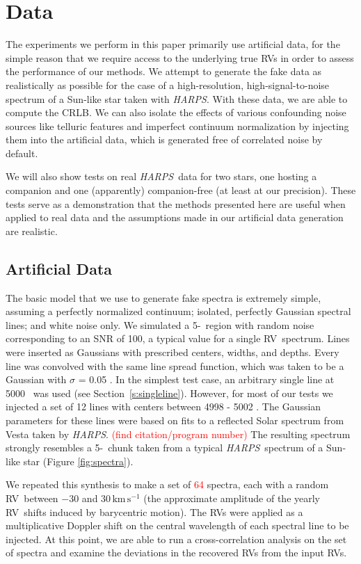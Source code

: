 \documentclass[modern]{aastex62}
\newcommand{\unit}[1]{\mathrm{#1}}
\newcommand{\km}{\unit{km}}
\newcommand{\s}{\unit{s}}
\newcommand{\kms}{\km\,\s^{-1}}
\newcommand{\ang}{\text{\normalfont\AA}}
\newcommand{\sectionname}{Section}
\newcommand{\todo}[1]{\textcolor{red}{#1}}  %
\newcommand{\acronym}[1]{{\small{#1}}}
\newcommand{\project}[1]{\textsl{#1}}
\newcommand{\HARPS}{\project{\acronym{HARPS}}}
\newcommand{\RV}{\acronym{RV}}
\newcommand{\CRLB}{\acronym{CRLB}}
\begin{document}
\section{Data}
\label{s:data}

The experiments we perform in this paper primarily use artificial data, for the simple reason that we require access to the underlying true RVs in order to assess the performance of our methods. 
We attempt to generate the fake data as realistically as possible for the case of a high-resolution, high-signal-to-noise spectrum of a Sun-like star taken with \HARPS. 
With these data, we are able to compute the \CRLB.  
We can also isolate the effects of various confounding noise sources like telluric features and imperfect continuum normalization by injecting them into the artificial data, which is generated free of correlated noise by default.

We will also show tests on real \HARPS\ data for two stars, one hosting a companion and
one (apparently) companion-free (at least at our precision). 
These tests serve as a demonstration that the methods presented here are useful when applied to real data and the assumptions made in our artificial data generation are realistic.

\subsection{Artificial Data}

The basic model that we use to generate fake spectra is extremely simple, assuming a perfectly normalized continuum; isolated, perfectly Gaussian spectral lines; and white noise only. 
We simulated a 5-\ang\ region with random noise corresponding to an SNR of 100, a typical value for a single \RV\ spectrum. 
Lines were inserted as Gaussians with prescribed centers, widths, and depths. 
Every line was convolved with the same line spread function, which was taken to be a Gaussian with $\sigma$ = 0.05 \ang. 
In the simplest test case, an arbitrary single line at 5000 \ang\ was used (see \sectionname~\ref{s:singleline}). 
However, for most of our tests we injected a set of 12 lines with centers between 4998 - 5002 \ang. 
The Gaussian parameters for these lines were based on fits to a reflected Solar spectrum from Vesta taken by \HARPS. \todo{(find citation/program number)} 
The resulting spectrum strongly resembles a 5-\ang\ chunk taken from a typical \HARPS\ spectrum of a Sun-like star (Figure \ref{fig:spectra}).

We repeated this synthesis to make a set of \todo{64} spectra, each with a random \RV\ between $-30$ and $30\,\kms$ (the approximate amplitude of the yearly \RV\ shifts induced by barycentric motion). 
The \RV s were applied as a multiplicative Doppler shift on the central wavelength of each spectral line to be injected. 
At this point, we are able to run a cross-correlation analysis on the set of spectra and examine the deviations in the recovered \RV s from the input \RV s.
\end{document}
